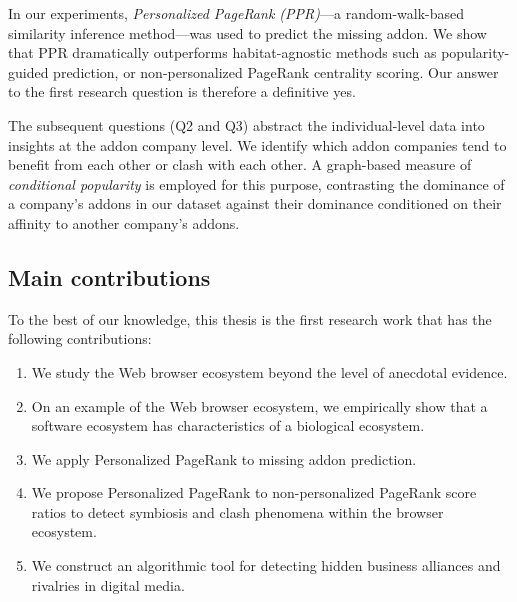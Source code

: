 \documentclass[ijoc,nonblindrev]{informs3} %
\numberwithin{equation}{subsection}
\begin{document}
In our experiments, \emph{Personalized PageRank (PPR)}---a random-walk-based similarity inference method---was used to predict the missing addon. We show that PPR dramatically outperforms habitat-agnostic methods such as popularity-guided prediction, or non-personalized PageRank centrality scoring. Our answer to the first research question is therefore a definitive yes.

The subsequent questions (Q2 and Q3) abstract the individual-level data into insights at the addon company level. We identify which addon companies tend to benefit from each other or clash with each other. A graph-based measure of {\it conditional popularity} is employed for this purpose, contrasting the dominance of a company's addons in our dataset against their dominance conditioned on their affinity to another company's addons.

\subsection{Main contributions}

To the best of our knowledge, this thesis is the first research work that has the following contributions:
\begin{enumerate}
\item We study the Web browser ecosystem beyond the level of anecdotal evidence.
\item On an example of the Web browser ecosystem, we empirically show that a software ecosystem has characteristics of a biological ecosystem.
\item We apply Personalized PageRank to missing addon prediction.
\item We propose Personalized PageRank to non-personalized PageRank score ratios to detect symbiosis and clash phenomena within the browser ecosystem.
\item We construct an algorithmic tool for detecting hidden business alliances and rivalries in digital media.
\end{enumerate}

\end{document}
